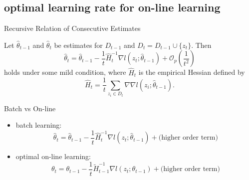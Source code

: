 \documentclass[fleqn,aspectratio=1610]{beamer}
\begin{document}
\subsection{optimal learning rate for on-line learning}
\label{sec:org8bb7d25}
\begin{frame}[label={sec:orgac527d3}]{Recursive Relation of Consecutive Estimates}
\begin{lemma}\label{sec:orgb06995b}
Let \(\hat\theta_{t-1}\) and \(\hat\theta_{t}\) be estimates for
\(D_{t-1}\) and \(D_{t}=D_{t-1}\cup\{z_{t}\}\).
Then
\begin{equation}
  \hat\theta_{t}
  =\hat\theta_{t-1}
  -\frac{1}{t}\hat{H}_{t}^{-1}\nabla l(z_{t};\hat\theta_{t-1})
  +\mathcal{O}_p\left(\frac{1}{t^2}\right)
\end{equation}
holds under some mild condition,
where \(\hat{H}_{t}\) is the empirical Hessian defined by
\begin{equation}
  \hat{H}_{t}=\frac{1}{t}\sum_{z_{i}\in D_{t}}
  \nabla\nabla l(z_{i};\hat\theta_{t-1}).
\end{equation}
\end{lemma}
\end{frame}

\begin{frame}[label={sec:orgc27f63d}]{Batch vs On-line}
\begin{itemize}
\item batch learning:
\begin{equation}
  \hat\theta_{t}
  =\hat\theta_{t-1}
  -\frac{1}{t}\hat{H}_{t}^{-1}\nabla l(z_{t};\hat\theta_{t-1})
  +\text{(higher order term)}
\end{equation}
\item optimal on-line learning:
\begin{equation}
  \theta_{t}
  =\theta_{t-1}
  -\frac{1}{t}\tilde{H}_{t-1}^{-1}\nabla l(z_{t};\theta_{t-1})
  +\text{(higher order term)}
\end{equation}
\end{itemize}
\end{frame}
\end{document}

